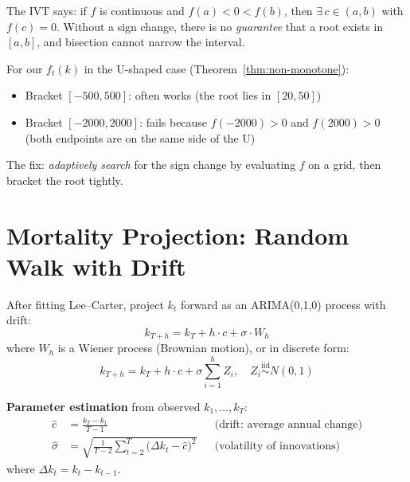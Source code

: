 \documentclass[11pt,a4paper]{article}
\theoremstyle{definition}
\begin{document}
\begin{intuition}
The IVT says: if $f$ is continuous and $f(a) < 0 < f(b)$, then
$\exists\, c \in (a,b)$ with $f(c) = 0$. Without a sign change,
there is no \emph{guarantee} that a root exists in $[a,b]$, and
bisection cannot narrow the interval.

For our $f_t(k)$ in the U-shaped case (Theorem~\ref{thm:non-monotone}):
\begin{itemize}
  \item Bracket $[-500, 500]$: often works (the root lies in $[20, 50]$)
  \item Bracket $[-2000, 2000]$: fails because $f(-2000) > 0$ and $f(2000) > 0$
    (both endpoints are on the same side of the U)
\end{itemize}

The fix: \emph{adaptively search} for the sign change by evaluating $f$
on a grid, then bracket the root tightly.
\end{intuition}

\section{Mortality Projection: Random Walk with Drift}
\label{sec:projection}

\begin{formaldef}
After fitting Lee--Carter, project $k_t$ forward as an ARIMA(0,1,0)
process with drift:
\begin{equation}
  k_{T+h} = k_T + h \cdot c + \sigma \cdot W_h
  \label{eq:rwd}
\end{equation}
where $W_h$ is a Wiener process (Brownian motion), or in discrete form:
\begin{equation}
  k_{T+h} = k_T + h \cdot c + \sigma \sum_{i=1}^{h} Z_i, \quad Z_i \stackrel{\text{iid}}{\sim} N(0,1)
  \label{eq:rwd-discrete}
\end{equation}

\textbf{Parameter estimation} from observed $k_1, \ldots, k_T$:
\begin{align}
  \hat{c} &= \frac{k_T - k_1}{T - 1} & &\text{(drift: average annual change)} \label{eq:drift} \\
  \hat{\sigma} &= \sqrt{\frac{1}{T-2}\sum_{t=2}^{T}\bigl(\Delta k_t - \hat{c}\bigr)^2}
  & &\text{(volatility of innovations)} \label{eq:sigma}
\end{align}
where $\Delta k_t = k_t - k_{t-1}$.
\end{formaldef}
\end{document}
